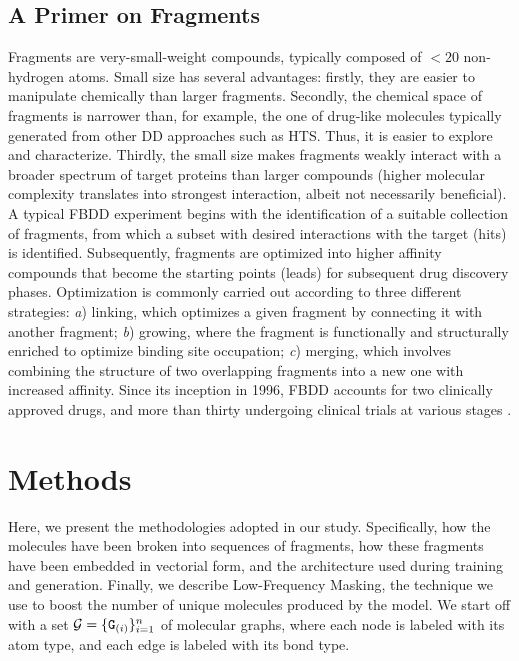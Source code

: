 \subsection{A Primer on Fragments}
Fragments are very-small-weight compounds, typically composed of $<20$ non-hydrogen atoms. Small size has several advantages: firstly, they are easier to manipulate chemically than larger fragments. Secondly, the chemical space of fragments is narrower than, for example, the one of drug-like molecules typically generated from other DD approaches such as HTS. Thus, it is easier to explore and characterize. Thirdly, the small size makes fragments weakly interact with a broader spectrum of target proteins than larger compounds (higher molecular complexity translates into strongest interaction, albeit not necessarily beneficial). A typical FBDD experiment begins with the identification of a suitable collection of fragments, from which a subset with desired interactions with the target (hits) is identified. Subsequently, fragments are optimized into higher affinity compounds that become the starting points (leads) for subsequent drug discovery phases. Optimization is commonly carried out according to three different strategies: \emph{a}) linking, which optimizes a given fragment by connecting it with another fragment; \emph{b}) growing, where the fragment is functionally and structurally enriched to optimize binding site occupation; \emph{c}) merging, which involves combining the structure of two overlapping fragments into a new one with increased affinity.
Since its inception in 1996, FBDD accounts for two clinically approved drugs, and more than thirty undergoing clinical trials at various stages \citep{davis2017fbdd}.

\section{Methods}\label{sec:aistats-methods}
Here, we present the methodologies adopted in our study. Specifically, how the molecules have been broken into sequences of fragments, how these fragments have been embedded in vectorial form, and the architecture used during training and generation. Finally, we describe Low-Frequency Masking, the technique we use to boost the number of unique molecules produced by the model. We start off with a set $\mathcal{G} = \{\PatternGraph{G}{i}\}_{i=1}^n$ of molecular graphs, where each node is labeled with its atom type, and each edge is labeled with its bond type.

